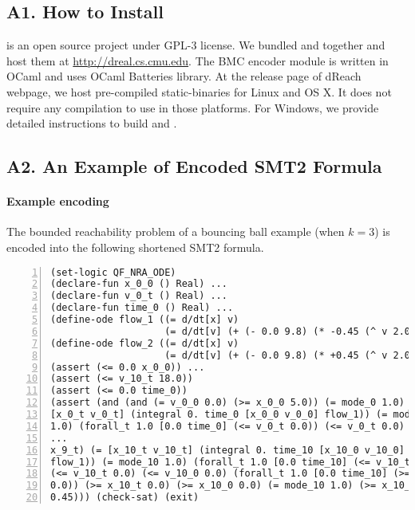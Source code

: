 \subsection*{A1. How to Install}
\dReach{} is an open source project under GPL-3 license. We bundled
\dReal{} and \dReach{} together and host them at
\url{http://dreal.cs.cmu.edu}. The BMC encoder module is written in
OCaml and uses OCaml Batteries library. At the release page of dReach
webpage, we host pre-compiled static-binaries for Linux and OS X. It
does not require any compilation to use \dReach{} in those platforms.
For Windows, we provide detailed instructions to build \dReach{} and
\dReal{}.

\subsection*{A2. An Example of Encoded SMT2 Formula}

\paragraph{Example encoding} The bounded reachability problem of a
bouncing ball example (when $k = 3$) is encoded into the following
shortened SMT2 formula.
\begin{Verbatim}[fontfamily=courier, frame=single, framesep=1mm,  numbers=left, fontsize=\scriptsize]
(set-logic QF_NRA_ODE)
(declare-fun x_0_0 () Real) ...
(declare-fun v_0_t () Real) ...
(declare-fun time_0 () Real) ...
(define-ode flow_1 ((= d/dt[x] v)
                    (= d/dt[v] (+ (- 0.0 9.8) (* -0.45 (^ v 2.0))))))
(define-ode flow_2 ((= d/dt[x] v)
                    (= d/dt[v] (+ (- 0.0 9.8) (* +0.45 (^ v 2.0))))))
(assert (<= 0.0 x_0_0)) ...
(assert (<= v_10_t 18.0))
(assert (<= 0.0 time_0))
(assert (and (and (= v_0_0 0.0) (>= x_0_0 5.0)) (= mode_0 1.0) (=
[x_0_t v_0_t] (integral 0. time_0 [x_0_0 v_0_0] flow_1)) (= mode_0
1.0) (forall_t 1.0 [0.0 time_0] (<= v_0_t 0.0)) (<= v_0_t 0.0) (<=
...
x_9_t) (= [x_10_t v_10_t] (integral 0. time_10 [x_10_0 v_10_0]
flow_1)) (= mode_10 1.0) (forall_t 1.0 [0.0 time_10] (<= v_10_t 0.0))
(<= v_10_t 0.0) (<= v_10_0 0.0) (forall_t 1.0 [0.0 time_10] (>= x_10_t
0.0)) (>= x_10_t 0.0) (>= x_10_0 0.0) (= mode_10 1.0) (>= x_10_t
0.45))) (check-sat) (exit)
\end{Verbatim}



